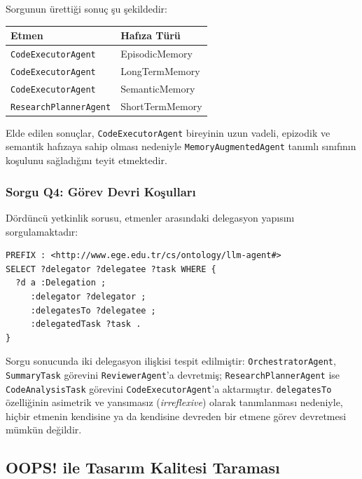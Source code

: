 \documentclass[10pt, a4paper, twocolumn]{article}
\begin{document}
\noindent Sorgunun ürettiği sonuç şu şekildedir:

\begin{center}
\scriptsize
\begin{tabular}{|p{2.8cm}|p{2.5cm}|}
\hline
\textbf{Etmen} & \textbf{Hafıza Türü} \\
\hline
\texttt{CodeExecutorAgent} & EpisodicMemory \\
\hline
\texttt{CodeExecutorAgent} & LongTermMemory \\
\hline
\texttt{CodeExecutorAgent} & SemanticMemory \\
\hline
\texttt{ResearchPlannerAgent} & ShortTermMemory \\
\hline
\end{tabular}
\label{tab:q3-result}
\end{center}

Elde edilen sonuçlar, \texttt{CodeExecutorAgent} bireyinin uzun vadeli, epizodik ve semantik hafızaya sahip olması nedeniyle \texttt{MemoryAugmentedAgent} tanımlı sınıfının koşulunu sağladığını teyit etmektedir.

\subsubsection*{Sorgu Q4: Görev Devri Koşulları}

Dördüncü yetkinlik sorusu, etmenler arasındaki delegasyon yapısını sorgulamaktadır:

\begin{lstlisting}[language=sparql]
PREFIX : <http://www.ege.edu.tr/cs/ontology/llm-agent#>
SELECT ?delegator ?delegatee ?task WHERE {
  ?d a :Delegation ;
     :delegator ?delegator ;
     :delegatesTo ?delegatee ;
     :delegatedTask ?task .
}
\end{lstlisting}

\noindent Sorgu sonucunda iki delegasyon ilişkisi tespit edilmiştir: \texttt{OrchestratorAgent}, \texttt{SummaryTask} görevini \texttt{ReviewerAgent}'a devretmiş; \texttt{ResearchPlannerAgent} ise \texttt{CodeAnalysisTask} görevini \texttt{CodeExecutorAgent}'a aktarmıştır. \texttt{delegatesTo} özelliğinin asimetrik ve yansımasız (\textit{irreflexive}) olarak tanımlanması nedeniyle, hiçbir etmenin kendisine ya da kendisine devreden bir etmene görev devretmesi mümkün değildir.

\subsection{OOPS! ile Tasarım Kalitesi Taraması}
\end{document}

